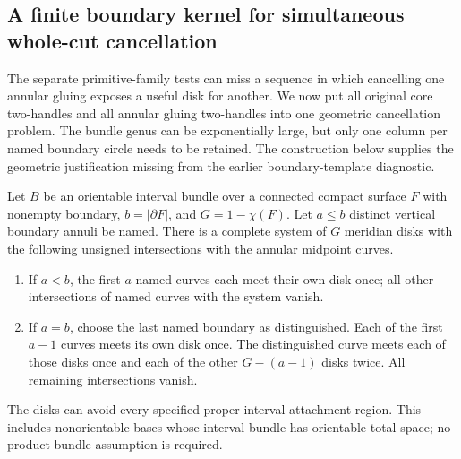 \subsection{A finite boundary kernel for simultaneous whole-cut cancellation}
\label{marked-cut:boundary-kernel}

The separate primitive-family tests can miss a sequence in which cancelling
one annular gluing exposes a useful disk for another. We now put all original
core two-handles and all annular gluing two-handles into one geometric
cancellation problem. The bundle genus can be exponentially large, but only
one column per named boundary circle needs to be retained. The construction
below supplies the geometric justification missing from the earlier
boundary-template diagnostic.

\begin{proposition}
\label{marked-cut:bundle-disk-system}
Let $B$ be an orientable interval bundle over a connected compact surface
$F$ with nonempty boundary, $b=|\partial F|$, and $G=1-\chi(F)$.
Let $a\le b$ distinct vertical boundary annuli be named. There is a complete
system of $G$ meridian disks with the following unsigned intersections with
the annular midpoint curves.
\begin{enumerate}
\item If $a<b$, the first $a$ named curves each meet their own disk once;
all other intersections of named curves with the system vanish.
\item If $a=b$, choose the last named boundary as distinguished. Each of
the first $a-1$ curves meets its own disk once. The distinguished curve
meets each of those disks once and each of the other $G-(a-1)$ disks twice.
All remaining intersections vanish.
\end{enumerate}
The disks can avoid every specified proper interval-attachment region.
This includes nonorientable bases whose interval bundle has orientable total
space; no product-bundle assumption is required.
\end{proposition}
